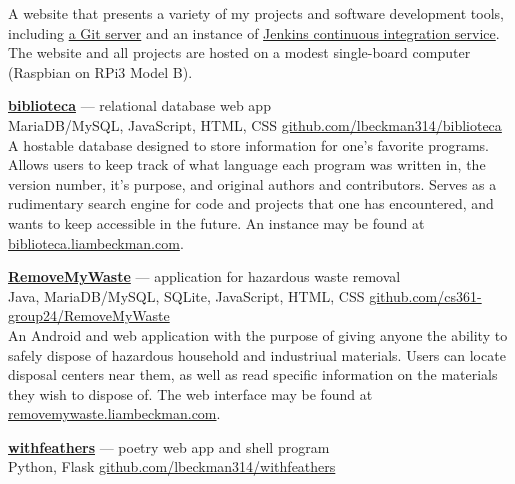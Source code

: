 A website that presents a variety of my projects and software development tools, including \href{https://git.liambeckman.com}{a Git server} and an instance of \href{https://liambeckman.com/jenkins}{Jenkins continuous integration service}. The website and all projects are hosted on a modest single-board computer (Raspbian on RPi3 Model B).

\textcolor{my-grey}{\dotfill}
\medbreak

\textcolor{my-blue}{\textbf{\href{https://biblioteca.liambeckman.com}{biblioteca}}} --- relational database web app\\
\textcolor{my-grey}{MariaDB/MySQL, JavaScript, HTML, CSS \hfill \href{https://github.com/lbeckman314/biblioteca}{github.com/lbeckman314/biblioteca}}\\

A hostable database designed to store information for one's favorite programs. Allows users to keep track of what language each program was written in, the version number, it’s purpose, and original authors and contributors. Serves as a rudimentary search engine for code and projects that one has encountered, and wants to keep accessible in the future. An instance may be found at \textcolor{my-blue}{\href{https://biblioteca.liambeckman.com}{biblioteca.liambeckman.com}}.

\textcolor{my-grey}{\dotfill}
\medbreak

\textcolor{my-blue}{\textbf{\href{https://liambeckman.com/code/matriz}{RemoveMyWaste}}} --- application for hazardous waste removal\\
\textcolor{my-grey}{Java, MariaDB/MySQL, SQLite, JavaScript, HTML, CSS \hfill \href{https://github.com/cs361-group24/RemoveMyWaste}{github.com/cs361-group24/RemoveMyWaste}}\\

An Android and web application with the purpose of giving anyone the ability to safely dispose of hazardous household and industriual materials. Users can locate disposal centers near them, as well as read specific information on the materials they wish to dispose of. The web interface may be found at \textcolor{my-blue}{\href{https://removemywaste.liambeckman.com}{removemywaste.liambeckman.com}}.

\textcolor{my-grey}{\dotfill}
\medbreak

\textcolor{my-blue}{\textbf{\href{https://withfeathers.liambeckman.com}{withfeathers}}} --- poetry web app and shell program\\
\textcolor{my-grey}{Python, Flask \hfill \href{https://github.com/lbeckman314/withfeathers}{github.com/lbeckman314/withfeathers}}\\

